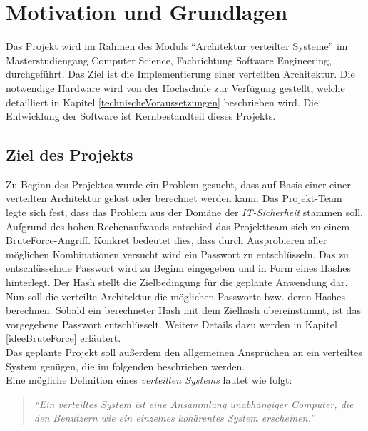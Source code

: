 \chapter{Motivation und Grundlagen}
Das Projekt wird im Rahmen des Moduls \enquote{Architektur verteilter Systeme} im Masterstudiengang Computer Science, Fachrichtung Software Engineering, durchgeführt.  Das Ziel ist die Implementierung einer verteilten Architektur. Die notwendige Hardware wird von der Hochschule zur Verfügung gestellt, welche detailliert in Kapitel \ref{technischeVoraussetzungen} beschrieben wird.
Die Entwicklung der Software ist Kernbestandteil dieses Projekts. 
\section{Ziel des Projekts}
Zu Beginn des Projektes wurde ein Problem gesucht, dass auf Basis einer einer verteilten Architektur gelöst oder berechnet werden kann. Das Projekt-Team legte sich fest, dass das Problem aus der Domäne der \emph{IT-Sicherheit} stammen soll. Aufgrund des hohen Rechenaufwands entschied das Projektteam sich zu einem BruteForce-Angriff. Konkret bedeutet dies, dass durch Ausprobieren aller möglichen Kombinationen versucht wird ein Passwort zu entschlüsseln. Das zu entschlüsselnde Passwort wird zu Beginn eingegeben und in Form eines Hashes hinterlegt. Der Hash stellt die Zielbedingung für die geplante Anwendung dar. Nun soll die verteilte Architektur die möglichen Passworte bzw. deren Hashes berechnen. Sobald ein berechneter Hash mit dem Zielhash übereinstimmt, ist das vorgegebene Passwort entschlüsselt. Weitere Details dazu werden in Kapitel \ref{ideeBruteForce} erläutert. \\

Das geplante Projekt soll außerdem den allgemeinen Ansprüchen an ein verteiltes System genügen, die im folgenden beschrieben werden. \\
Eine mögliche Definition eines \emph{verteilten Systems} lautet wie folgt:
\begin{quotation}
	\textit{\enquote{Ein verteiltes System ist eine Ansammlung unabhängiger Computer, die den Benutzern wie ein einzelnes kohärentes System erscheinen.}} \citep{tanenbaum}
\end{quotation}

